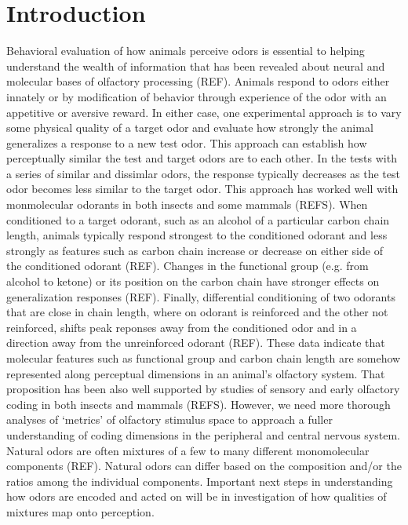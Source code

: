 \section*{Introduction}
\label{sec:introduction}

Behavioral evaluation of how animals perceive odors is essential to helping understand the wealth of information that has been revealed about neural and molecular bases of olfactory processing (REF). 
Animals respond to odors either innately or by modification of behavior through experience of the odor with an appetitive or aversive reward. 
In either case, one experimental approach is to vary some physical quality of a target odor and evaluate how strongly the animal generalizes a response to a new test odor. 
This approach can establish how perceptually similar the test and target odors are to each other. 
In the tests with a series of similar and dissimlar odors, the response typically decreases as the test odor becomes less similar to the target odor. 
This approach has worked well with monmolecular odorants in both insects and some mammals (REFS). 
When conditioned to a target odorant, such as an alcohol of a particular carbon chain length, animals typically respond strongest to the conditioned odorant and less strongly as features such as carbon chain increase or decrease on either side of the conditioned odorant (REF). 
Changes in the functional group (e.g. from alcohol to ketone) or its position on the carbon chain have stronger effects on generalization responses (REF). 
Finally, differential conditioning of two odorants that are close in chain length, where on odorant is reinforced and the other not reinforced, shifts peak reponses away from the conditioned odor and in a direction away from the unreinforced odorant (REF). 
These data indicate that molecular features such as functional group and carbon chain length are somehow represented along perceptual dimensions in an animal’s olfactory system. 
That proposition has been also well supported by studies of sensory and early olfactory coding in both insects and mammals (REFS). 
 However, we need more thorough analyses of ‘metrics’ of olfactory stimulus space to approach a fuller understanding of coding dimensions in the peripheral and central nervous system. 
 Natural odors are often mixtures of a few to many different monomolecular components (REF). 
 Natural odors can differ based on the composition and/or the ratios among the individual components. 
 Important next steps in understanding how odors are encoded and acted on will be in investigation of how qualities of mixtures map onto perception. 
